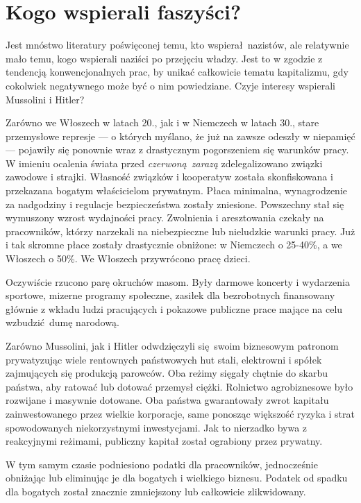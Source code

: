 \documentclass[12pt]{book}
\newcommand{\sekcja}[1]{
  \addcontentsline{toc}{section}{#1}
  \section*{#1}
}
\begin{document}
\sekcja{Kogo wspierali faszyści?}

Jest mnóstwo literatury poświęconej temu, kto wspierał nazistów, ale relatywnie mało temu, kogo wspierali naziści po przejęciu władzy. Jest to w zgodzie z tendencją konwencjonalnych prac, by unikać całkowicie tematu kapitalizmu, gdy cokolwiek negatywnego może być o nim powiedziane. Czyje interesy wspierali Mussolini i Hitler?

Zarówno we Włoszech w latach 20., jak i w Niemczech w latach 30., stare przemysłowe represje — o których myślano, że już na zawsze odeszły w niepamięć — pojawiły się ponownie wraz z drastycznym pogorszeniem się warunków pracy. W imieniu ocalenia świata przed \textit{czerwoną zarazą} zdelegalizowano związki zawodowe i strajki. Własność związków i kooperatyw została skonfiskowana i przekazana bogatym właścicielom prywatnym. Płaca minimalna, wynagrodzenie za nadgodziny i regulacje bezpieczeństwa zostały zniesione. Powszechny stał się wymuszony wzrost wydajności pracy. Zwolnienia i aresztowania czekały na pracowników, którzy narzekali na niebezpieczne lub nieludzkie warunki pracy. Już i tak skromne płace zostały drastycznie obniżone: w Niemczech o 25-40\%, a we Włoszech o 50\%. We Włoszech przywrócono pracę dzieci.

Oczywiście rzucono parę okruchów masom. Były darmowe koncerty i wydarzenia sportowe, mizerne programy społeczne, zasiłek dla bezrobotnych finansowany głównie z wkładu ludzi pracujących i pokazowe publiczne prace mające na celu wzbudzić dumę narodową.

Zarówno Mussolini, jak i Hitler odwdzięczyli się swoim biznesowym patronom prywatyzując wiele rentownych państwowych hut stali, elektrowni i spółek zajmujących się produkcją parowców. Oba reżimy sięgały chętnie do skarbu państwa, aby ratować lub dotować przemysł ciężki. Rolnictwo agrobiznesowe było rozwijane i masywnie dotowane. Oba państwa gwarantowały zwrot kapitału zainwestowanego przez wielkie korporacje, same ponosząc większość ryzyka i strat spowodowanych niekorzystnymi inwestycjami. Jak to nierzadko bywa z reakcyjnymi reżimami, publiczny kapitał został ograbiony przez prywatny.

W tym samym czasie podniesiono podatki dla pracowników, jednocześnie obniżając lub eliminując je dla bogatych i wielkiego biznesu. Podatek od spadku dla bogatych został znacznie zmniejszony lub całkowicie zlikwidowany.
\end{document}
